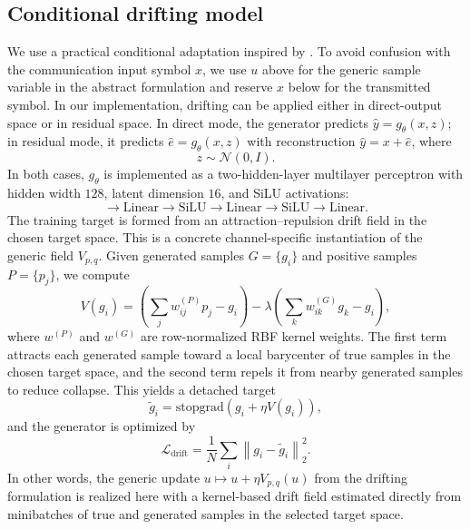 \documentclass[conference]{IEEEtran}
\begin{document}
\subsection{Conditional drifting model}
  We use a practical conditional adaptation inspired by \cite{drifting}.
  To avoid confusion with the communication input symbol \(x\), we use \(u\) above for the generic
  sample variable in the abstract formulation and reserve \(x\) below for the transmitted symbol.
  In our implementation, drifting can be applied either in direct-output space or in residual space.
  In direct mode, the generator predicts \(\hat y = g_\theta(x,z)\); in residual mode, it predicts
  \(\hat e = g_\theta(x,z)\) with reconstruction \(\hat y = x + \hat e\), where
  \begin{equation}
  z \sim \mathcal{N}(0, I).
  \end{equation}
  In both cases, \(g_\theta\) is implemented as a two-hidden-layer multilayer perceptron with hidden
  width \(128\), latent dimension \(16\), and SiLU activations:
\begin{equation}
[x, z]
\rightarrow
\mathrm{Linear}
\rightarrow
\mathrm{SiLU}
\rightarrow
\mathrm{Linear}
\rightarrow
\mathrm{SiLU}
\rightarrow
\mathrm{Linear}.
\end{equation}
The training target is formed from an attraction--repulsion drift field in the chosen target space. This is a concrete channel-specific instantiation of the generic field \(V_{p,q}\).
Given generated samples \(G = \{g_i\}\) and positive samples \(P = \{p_j\}\), we compute
\begin{equation}
V(g_i)
=
\left(
\sum_j w^{(P)}_{ij} p_j - g_i
\right)
-
\lambda
\left(
\sum_k w^{(G)}_{ik} g_k - g_i
\right),
\end{equation}
where \(w^{(P)}\) and \(w^{(G)}\) are row-normalized RBF kernel weights.
The first term attracts each generated sample toward a local barycenter of true samples in the chosen target space, and the second term repels it from nearby generated samples to reduce collapse.
This yields a detached target
\begin{equation}
\tilde{g}_i
=
\mathrm{stopgrad}\!\left(g_i + \eta V(g_i)\right),
\end{equation}
and the generator is optimized by
\begin{equation}
\mathcal{L}_{\text{drift}}
=
\frac{1}{N}
\sum_i
\left\|
g_i - \tilde{g}_i
\right\|_2^2.
\end{equation}
In other words, the generic update \(u \mapsto u + \eta V_{p,q}(u)\) from the drifting formulation is realized here with a kernel-based drift field estimated directly from minibatches of true and generated samples in the selected target space.
\end{document}

